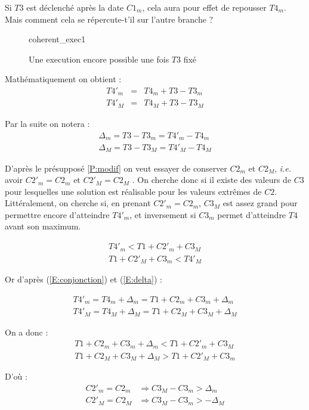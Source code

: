 \documentclass[10pt,a4paper]{article}
\begin{document}
Si $T3$ est déclenché après la date $C1_m$, cela aura pour effet de repousser $T4_m$. Mais comment cela se répercute-t'il sur 
l'autre branche ?

\begin{figure}[h]
\centering
	
	\schemaScenario coherent_exec1
	\caption{Une execution encore possible une fois $T3$ fixé}
	\label{S:coherent_exec1}
\end{figure}

Mathématiquement on obtient :
\begin{eqnarray}
	T4'_m &=& T4_m + T3 - T3_m \\
	T4'_M &=& T4_M + T3 - T3_M \nonumber
\label{E:simplePropagation}
\end{eqnarray}

Par la suite on notera :
\begin{eqnarray}
	\Delta{}_m = T3 - T3_m = T4'_m - T4_m \\
	\Delta{}_M = T3 - T3_M = T4'_M - T4_M \nonumber
	\label{E:delta}
\end{eqnarray}

D'après le présupposé \ref{P:modif} on veut essayer de conserver $C2_m$ et $C2_M$, \textit{i.e.} avoir $C2'_m = C2_m$ et $C2'_M = C2_M$ . On cherche donc si il existe des valeurs de $C3$ pour lesquelles une solution est réalisable pour les valeurs extrêmes de $C2$. Littéralement, on cherche si, en prenant $C2'_m = C2_m$, $C3_M$ est assez grand pour permettre encore d'atteindre $T4'_m$, et inversement si $C3_m$ permet d'atteindre $T4$ avant son maximum.

\begin{eqnarray}
T4'_m < T1 + C2'_m + C3_M \\
T1 + C2'_M + C3_m < T4'_M \nonumber
\end{eqnarray}

Or d'après (\ref{E:conjonction}) et (\ref{E:delta}) :

\begin{eqnarray}
T4'_m = T4_m + \Delta{}_m = T1 + C2_m + C3_m + \Delta{}_m \\
T4'_M = T4_M + \Delta{}_M = T1 + C2_M + C3_M + \Delta{}_M \nonumber
\end{eqnarray}

On a donc :
\begin{eqnarray}
T1 + C2_m + C3_m + \Delta{}_m < T1 + C2'_m + C3_M \\
T1 + C2_M + C3_M + \Delta{}_M > T1 + C2'_M + C3_m  \nonumber
\end{eqnarray}

D'où :
\begin{eqnarray}
C2'_m = C2_m &\Rightarrow C3_M - C3_m > \Delta{}_m \\
C2'_M = C2_M &\Rightarrow C3_M - C3_m > -\Delta{}_M \nonumber
\end{eqnarray}
\end{document}
